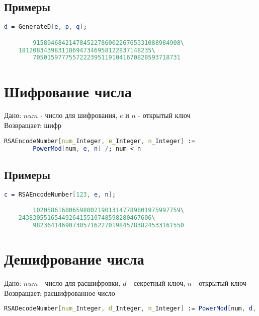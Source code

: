     	\subsection{Примеры}

    	\begin{lstlisting}[language=Mathematica,caption={
      		Пример	
    	}]
		d = GenerateD[e, p, q];

		91589468421478452278600226765331088984908\
    1812083439831186947346958122837148235\
		70501597775572223951191041670828593718731
    	\end{lstlisting}

	\section{Шифрование числа}
		Дано: $num$ - число для шифрования, $e$ и $n$ - открытый ключ \\
		Возвращает: шифр

		\begin{lstlisting}[language=Mathematica,caption={
      		Шифрование заданного числа	
    	}]
    	RSAEncodeNumber[num_Integer, e_Integer, n_Integer] := 
    	PowerMod[num, e, n] /; num < n
    	\end{lstlisting}

    	\subsection{Примеры}

    	\begin{lstlisting}[language=Mathematica,caption={
      		Пример	
    	}]
		c = RSAEncodeNumber[123, e, n];

		10205861680659800219013147789801975997759\
    2438305516544926415510748598280467606\
		982364146907305716227019845783824533161550
    	\end{lstlisting}

	\section{Дешифрование числа}
		Дано: $num$ - число для расшифровки, $d$ - секретный ключ, $n$ - открытый ключ \\
		Возвращает: расшифрованное число

		\begin{lstlisting}[language=Mathematica,caption={
      		Дешифрование числа	
    	}]
		RSADecodeNumber[num_Integer, d_Integer, n_Integer] := PowerMod[num, d, n]
    	\end{lstlisting}

